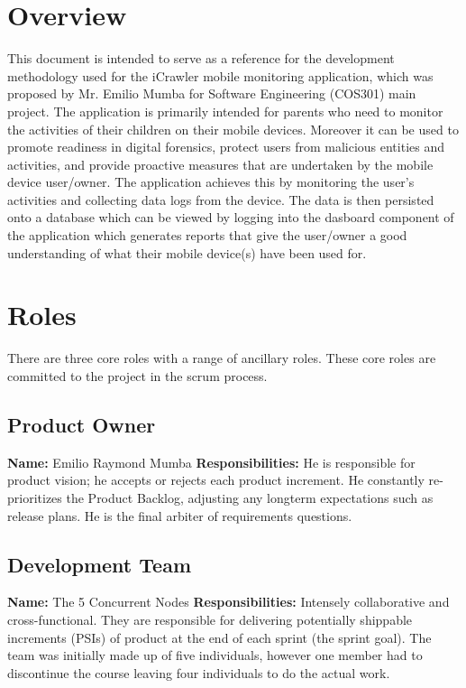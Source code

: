 \documentclass[hidelinks, 12pt, oneside]{article}
\begin{document}
	
	
	\tableofcontents
	\newpage
	
	\section{Overview}
	\begin{flushleft}
		This document is intended to serve as a reference for the development methodology used for the iCrawler mobile monitoring application,
		 which was proposed 
	by Mr. Emilio Mumba for Software Engineering (COS301) main project.\newline\newline
	The application is primarily intended for parents who need to monitor the activities of their children on their mobile devices. Moreover it can be used to promote readiness in digital forensics, protect users from malicious entities and activities, and provide proactive 
	measures that are undertaken by the mobile device user/owner. The application achieves this by monitoring the user's activities and collecting data logs from the device. The data
	is then persisted onto a database which can be viewed by logging into the dasboard component of the application which generates reports that give the user/owner a good understanding of what their mobile device(s) have been used for.\newpage
	\end{flushleft}

	
	\section{Roles}
	There are three core roles with a range of ancillary roles. These core roles are committed to the project in the scrum process.
	\subsection{Product Owner}
	\textbf{Name:} Emilio Raymond Mumba\newline
	\textbf{Responsibilities:} He is responsible for product vision; he accepts or rejects each product increment. He constantly re-prioritizes the Product Backlog, adjusting any longterm expectations such as release plans. He is the final arbiter of requirements questions.
 	\subsection{Development Team}
 	\textbf{Name:} The 5 Concurrent Nodes\newline
	\textbf{Responsibilities:} Intensely collaborative and cross-functional. They are responsible for delivering potentially shippable increments (PSIs) of product at the end of each sprint (the sprint goal). 
	The team
	was initially made up of five individuals, however one member had to discontinue the course leaving four individuals to do the actual work.
\end{document}
